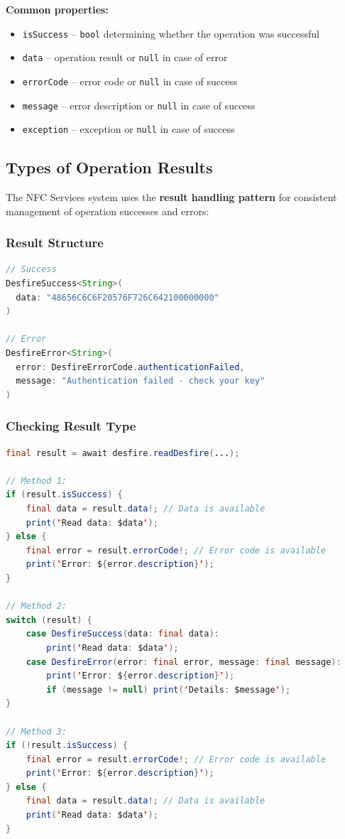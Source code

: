 \documentclass[a4paper,12pt]{article}
\begin{document}
\textbf{Common properties:}
\begin{itemize}
    \item \texttt{isSuccess} -- \texttt{bool} determining whether the operation was successful
    \item \texttt{data} -- operation result or \texttt{null} in case of error
    \item \texttt{errorCode} -- error code or \texttt{null} in case of success
    \item \texttt{message} -- error description or \texttt{null} in case of success
    \item \texttt{exception} -- exception or \texttt{null} in case of success
\end{itemize}

\newpage

\subsection{Types of Operation Results}
The NFC Services system uses the \textbf{result handling pattern} for consistent management of operation successes and errors:

\subsubsection*{Result Structure}
\begin{lstlisting}[language=Java]
// Success
DesfireSuccess<String>(
  data: "48656C6C6F20576F726C642100000000"
)

// Error
DesfireError<String>(
  error: DesfireErrorCode.authenticationFailed,
  message: "Authentication failed - check your key"
)
\end{lstlisting}

\subsubsection*{Checking Result Type}
\begin{lstlisting}[language=Java]
final result = await desfire.readDesfire(...);

// Method 1:
if (result.isSuccess) {
    final data = result.data!; // Data is available
    print('Read data: $data');
} else {
    final error = result.errorCode!; // Error code is available
    print('Error: ${error.description}');
}

// Method 2:
switch (result) {
    case DesfireSuccess(data: final data):
        print('Read data: $data');
    case DesfireError(error: final error, message: final message):
        print('Error: ${error.description}');
        if (message != null) print('Details: $message');
}

// Method 3:
if (!result.isSuccess) {
    final error = result.errorCode!; // Error code is available
    print('Error: ${error.description}');
} else {
    final data = result.data!; // Data is available
    print('Read data: $data');
}
\end{lstlisting}
\end{document}
